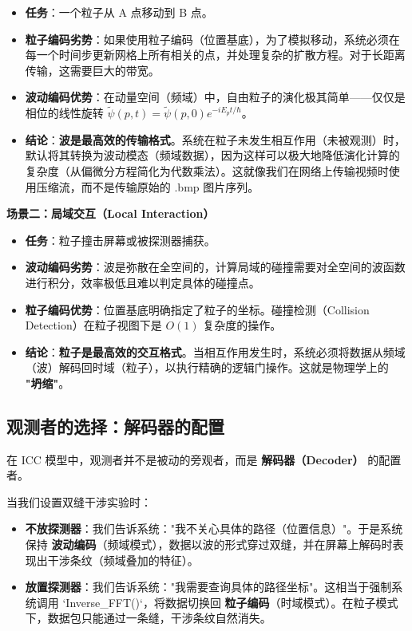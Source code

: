 \begin{itemize}
\item \textbf{任务}：一个粒子从 A 点移动到 B 点。

\item \textbf{粒子编码劣势}：如果使用粒子编码（位置基底），为了模拟移动，系统必须在每一个时间步更新网格上所有相关的点，并处理复杂的扩散方程。对于长距离传输，这需要巨大的带宽。

\item \textbf{波动编码优势}：在动量空间（频域）中，自由粒子的演化极其简单——仅仅是相位的线性旋转 $\tilde{\psi}(p, t) = \tilde{\psi}(p, 0) e^{-iE_p t/\hbar}$。

\item \textbf{结论}：\textbf{波是最高效的传输格式}。系统在粒子未发生相互作用（未被观测）时，默认将其转换为波动模态（频域数据），因为这样可以极大地降低演化计算的复杂度（从偏微分方程简化为代数乘法）。这就像我们在网络上传输视频时使用压缩流，而不是传输原始的 .bmp 图片序列。
\end{itemize}

\textbf{场景二：局域交互（Local Interaction）}

\begin{itemize}
\item \textbf{任务}：粒子撞击屏幕或被探测器捕获。

\item \textbf{波动编码劣势}：波是弥散在全空间的，计算局域的碰撞需要对全空间的波函数进行积分，效率极低且难以判定具体的碰撞点。

\item \textbf{粒子编码优势}：位置基底明确指定了粒子的坐标。碰撞检测（Collision Detection）在粒子视图下是 $O(1)$ 复杂度的操作。

\item \textbf{结论}：\textbf{粒子是最高效的交互格式}。当相互作用发生时，系统必须将数据从频域（波）解码回时域（粒子），以执行精确的逻辑门操作。这就是物理学上的 \textbf{"坍缩"}。
\end{itemize}

\subsection{观测者的选择：解码器的配置}

在 ICC 模型中，观测者并不是被动的旁观者，而是 \textbf{解码器（Decoder）} 的配置者。

当我们设置双缝干涉实验时：

\begin{itemize}
\item \textbf{不放探测器}：我们告诉系统："我不关心具体的路径（位置信息）"。于是系统保持 \textbf{波动编码}（频域模式），数据以波的形式穿过双缝，并在屏幕上解码时表现出干涉条纹（频域叠加的特征）。

\item \textbf{放置探测器}：我们告诉系统："我需要查询具体的路径坐标"。这相当于强制系统调用 `Inverse_FFT()`，将数据切换回 \textbf{粒子编码}（时域模式）。在粒子模式下，数据包只能通过一条缝，干涉条纹自然消失。
\end{itemize}

